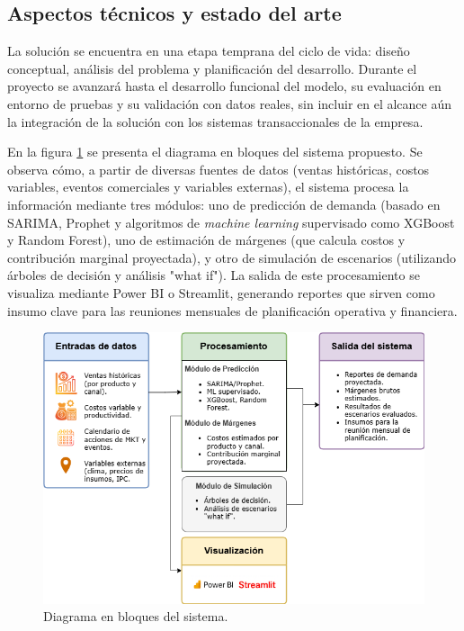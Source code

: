 \documentclass[
11pt, %
]{charter}
\begin{document}
\subsection*{Aspectos técnicos y estado del arte}
La solución se encuentra en una etapa temprana del ciclo de vida: diseño conceptual, análisis del problema y planificación del desarrollo. Durante el proyecto se avanzará hasta el desarrollo funcional del modelo, su evaluación en entorno de pruebas y su validación con datos reales, sin incluir en el alcance aún la integración de la solución con los sistemas transaccionales de la empresa.

En la figura \ref{fig:diagBloques} se presenta el diagrama en bloques del sistema propuesto. Se observa cómo, a partir de diversas fuentes de datos (ventas históricas, costos variables, eventos comerciales y variables externas), el sistema procesa la información mediante tres módulos: uno de predicción de demanda (basado en SARIMA, Prophet y algoritmos de \textit{machine learning} supervisado como XGBoost y Random Forest), uno de estimación de márgenes (que calcula costos y contribución marginal proyectada), y otro de simulación de escenarios (utilizando árboles de decisión y análisis "what if"). La salida de este procesamiento se visualiza mediante Power BI o Streamlit, generando reportes que sirven como insumo clave para las reuniones mensuales de planificación operativa y financiera.

\vspace{15px}

\begin{figure}[htpb]
\centering 
\includegraphics[width=.65\textwidth]{./Figuras/Diagrama_proyecto.png}
\caption{Diagrama en bloques del sistema.}
\label{fig:diagBloques}
\end{figure}

\vspace{25px}
\end{document}
